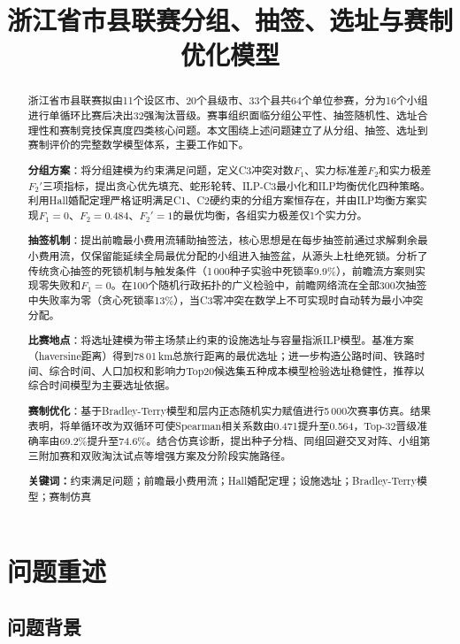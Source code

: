 \documentclass[12pt,a4paper]{article}
\title{\textbf{浙江省市县联赛分组、抽签、选址与赛制优化模型}}
\date{}
\begin{document}
\maketitle

\begin{abstract}
  浙江省市县联赛拟由11个设区市、20个县级市、33个县共64个单位参赛，分为16个小组进行单循环比赛后决出32强淘汰晋级。赛事组织面临分组公平性、抽签随机性、选址合理性和赛制竞技保真度四类核心问题。本文围绕上述问题建立了从分组、抽签、选址到赛制评价的完整数学模型体系，主要工作如下。

  \textbf{分组方案}：将分组建模为约束满足问题，定义C3冲突对数$F_1$、实力标准差$F_2$和实力极差$F_2'$三项指标，提出贪心优先填充、蛇形轮转、ILP-C3最小化和ILP均衡优化四种策略。利用Hall婚配定理严格证明满足C1、C2硬约束的分组方案恒存在，并由ILP均衡方案实现$F_1=0$、$F_2=0.484$、$F_2'=1$的最优均衡，各组实力极差仅1个实力分。

  \textbf{抽签机制}：提出前瞻最小费用流辅助抽签法，核心思想是在每步抽签前通过求解剩余最小费用流，仅保留能延续全局最优分配的小组进入抽签盆，从源头上杜绝死锁。分析了传统贪心抽签的死锁机制与触发条件（1\,000种子实验中死锁率9.9\%），前瞻流方案则实现零失败和$F_1=0$。在100个随机行政拓扑的广义检验中，前瞻网络流在全部300次抽签中失败率为零（贪心死锁率13\%），当C3零冲突在数学上不可实现时自动转为最小冲突分配。

  \textbf{比赛地点}：将选址建模为带主场禁止约束的设施选址与容量指派ILP模型。基准方案（haversine距离）得到78\,01\,km总旅行距离的最优选址；进一步构造公路时间、铁路时间、综合时间、人口加权和影响力Top20候选集五种成本模型检验选址稳健性，推荐以综合时间模型为主要选址依据。

  \textbf{赛制优化}：基于Bradley-Terry模型和层内正态随机实力赋值进行5\,000次赛事仿真。结果表明，将单循环改为双循环可使Spearman相关系数由0.471提升至0.564，Top-32晋级准确率由69.2\%提升至74.6\%。结合仿真诊断，提出种子分档、同组回避交叉对阵、小组第三附加赛和双败淘汰试点等增强方案及分阶段实施路径。

  \noindent\textbf{关键词：}约束满足问题；前瞻最小费用流；Hall婚配定理；设施选址；Bradley-Terry模型；赛制仿真
\end{abstract}

\newpage

\section{问题重述}

\subsection{问题背景}
\end{document}

